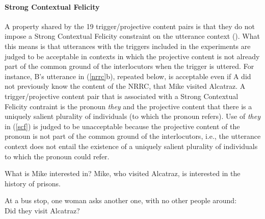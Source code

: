 \documentclass[11pt,fleqn]{article}
\newcommand{\6}{\mbox{$[\hspace*{-.6mm}[$}}
\newcommand{\9}{\mbox{$]\hspace*{-.6mm}]$}}
\def\infelic{{\leavevmode\llap{\#}}}
\begin{document}
\paragraph{Strong Contextual Felicity} A property shared by the 19 trigger/projective content pairs is that they do not impose a Strong Contextual Felicity constraint on the utterance context (\citealt{brst-lang11}). What this means is that utterances with the triggers included in the experiments are judged to be acceptable in contexts in which the projective content is not already part of the common ground of the interlocutors when the trigger is uttered. For instance, B's utterance in (\ref{nrrc}b), repeated below, is acceptable even if A did not previously know the content of the NRRC, that Mike visited Alcatraz. A trigger/projective content pair that is associated with a Strong Contextual Felicity contraint is the pronoun {\em they} and the projective content that there is a uniquely salient plurality of individuals (to which the pronoun refers). Use of {\em they} in (\ref{scf}) is judged to be unacceptable because the projective content of the pronoun is not part of the common ground of the interlocutors, i.e., the utterance context does not entail the existence of a uniquely salient plurality of individuals to which the pronoun could refer. 

\begin{exe}
\begin{xlist}
 What is Mike interested in?
 Mike, who visited Alcatraz, is interested in the history of prisons.
\end{xlist}

\ex\label{scf} At a bus stop, one woman asks another one, with no other people around: \\ \infelic Did they visit Alcatraz?
\end{exe}
\end{document}
